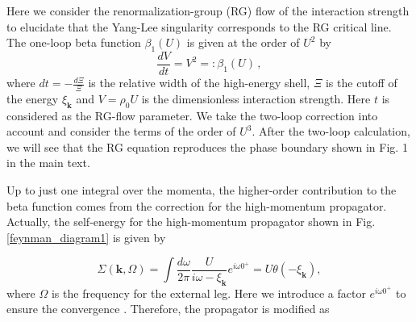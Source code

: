 \documentclass[aps,onecolumn,superscriptaddress,notitlepage,longbibliography]{revtex4-1}
\begin{document}
Here we consider the renormalization-group (RG) flow of the interaction strength to elucidate that the Yang-Lee singularity corresponds to the RG critical line. The one-loop beta function $\beta_1(U)$ is given at the order of $U^2$ by \cite{Shankar1994,Nagaosa}
\begin{equation}
  \frac{dV}{dt}=V^{2}=:\beta_1(U)\,,
  \label{one-loop}
\end{equation}
where $dt=-\frac{d\Xi}{\Xi}$ is the relative width of the high-energy
shell, $\Xi$ is the cutoff of the energy $\xi_{\bm{k}}$ and $V=\rho_0 U$ is the dimensionless interaction strength. Here $t$ is considered as the RG-flow parameter. We take the two-loop correction into account and consider the terms of the order of $U^3$. After the two-loop calculation, we will see that the RG equation reproduces the phase boundary shown in Fig. 1 in the main text.

Up to just one integral over the momenta, the higher-order contribution
to the beta function comes from the correction for the high-momentum propagator.
Actually, the self-energy for the high-momentum
propagator shown in Fig. \ref{feynman_diagram1} is given by

\begin{equation}
  \Sigma(\bm{k},\Omega)=\int\frac{d\omega}{2\pi}\frac{U}{i\omega-\xi_{\bm{k}}}e^{i\omega0^+}=U\theta(-\xi_{\bm{k}}),
\end{equation}
where $\Omega$ is the frequency for the external leg. Here we introduce a factor $e^{i\omega0^+}$ to ensure the convergence \cite{Shankar1994}. Therefore, the propagator is modified as
\end{document}
